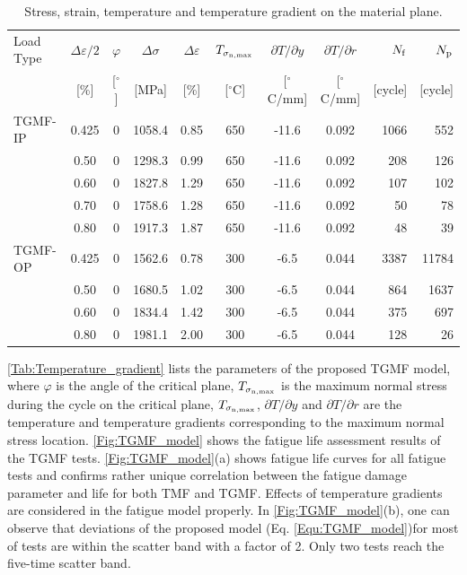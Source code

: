 \documentclass[preprint,5p,twocolumn,10pt,sort&compress]{elsarticle}
\begin{document}
\begin{table}
  \centering
  \caption{Stress, strain, temperature and temperature gradient on the material plane.}
    \begin{tabular}{lcccccccrr}
    \toprule
    Load Type & $\Delta\varepsilon/2$ & $\varphi$ & $\Delta\sigma$ & $\Delta\varepsilon$ & $T_{\sigma_{\rm n,\max}}$   & $\partial T/\partial y$ & $\partial T/\partial r$ & $N_{\rm{f}}$ & $N_{\rm{p}}$ \\
          & [\%]  & [$^{\circ}$] & [MPa] & [\%]  & [$^\circ$C]   & [$^\circ$C/mm] & [$^\circ$C/mm] & [cycle] & [cycle] \\
    \midrule
    TGMF-IP & 0.425   & 0     & 1058.4  & 0.85  & 650   & -11.6  & 0.092  & 1066  & 552 \\
      & 0.50   & 0     & 1298.3  & 0.99  & 650   & -11.6  & 0.092  & 208   & 126 \\
      & 0.60   & 0     & 1827.8  & 1.29  & 650   & -11.6  & 0.092  & 107   & 102 \\
      & 0.70   & 0     & 1758.6  & 1.28  & 650   & -11.6  & 0.092  & 50    & 78 \\
      & 0.80   & 0     & 1917.3  & 1.87  & 650   & -11.6  & 0.092  & 48    & 39 \\
    \midrule
    TGMF-OP & 0.425   & 0     & 1562.6  & 0.78  & 300   & -6.5  & 0.044  & 3387  & 11784 \\
      & 0.50   & 0     & 1680.5  & 1.02  & 300   & -6.5  & 0.044  & 864   & 1637 \\
      & 0.60   & 0     & 1834.4  & 1.42  & 300   & -6.5  & 0.044  & 375   & 697 \\
      & 0.80   & 0     & 1981.1  & 2.00  & 300   & -6.5  & 0.044  & 128   & 26 \\
    \bottomrule
    \end{tabular}%
  \label{Tab:Temperature_gradient}%
\end{table}%

\autoref{Tab:Temperature_gradient} lists the parameters of the proposed TGMF model, where $\varphi$ is the angle of the critical plane, $T_{\sigma_{\rm n,\max}}$ is the maximum normal stress during the cycle on the critical plane, $T_{\sigma_{\rm n,\max}}$, $\partial T/\partial y$ and $\partial T/\partial r$ are the temperature and temperature gradients corresponding to the maximum normal stress location.
\autoref{Fig:TGMF_model} shows the fatigue life assessment results of the TGMF tests.  \autoref{Fig:TGMF_model}(a) shows fatigue life curves for all fatigue tests and confirms rather unique correlation between the fatigue damage parameter and life for both TMF and TGMF. Effects of temperature gradients are considered in the fatigue model properly. In \autoref{Fig:TGMF_model}(b), one can observe that deviations of the proposed model (Eq. \eqref{Equ:TGMF_model})for most of tests are within the scatter band with a factor of 2. Only two tests reach the five-time scatter band. 
\end{document}
